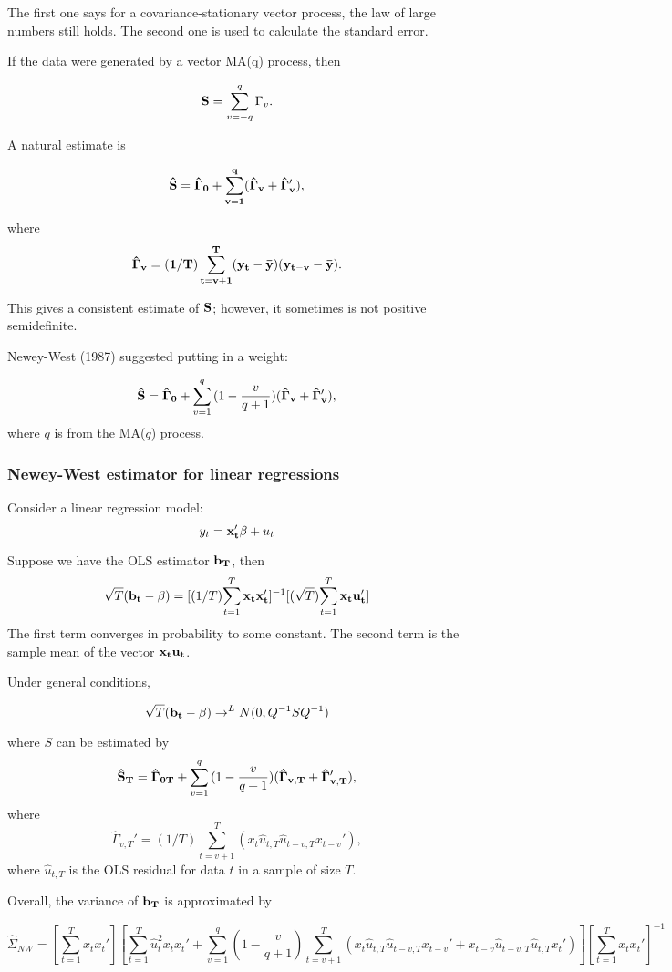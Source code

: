 The first one says for a covariance-stationary vector process, the law
of large numbers still holds.  The second one is used to calculate the
standard error.

If the data were generated by a vector MA(q) process, then 

 \[ {\bf S} = \sum_{v=-q}^{q} \Gamma_v . \]

A natural estimate is

 \[  \bf \hat S = \hat \Gamma_0 + \sum_{v=1}^{q} (\hat \Gamma_v + \hat \Gamma_v' ), \]

where  \[  \bf \hat \Gamma_v = (1/T)  \sum_{t=v+1}^{T} (y_t- \bar y)(y_{t-v} - \bar y). \]

This gives a consistent estimate of $\bf S$; however, it sometimes is
not positive semidefinite.

Newey-West (1987) suggested putting in a weight:

 \[  {\bf \hat S = \hat \Gamma_0} + \sum_{v=1}^{q} {(1- \frac{v}{q+1})} (\bf \hat \Gamma_v + \hat \Gamma_v' ), \]
where $q$ is from the MA($q$) process.


\subsubsection{ Newey-West estimator for linear regressions}

Consider a linear regression model:
\[ y_t={ \bf x_t' \beta} + u_t \]

Suppose we have the OLS estimator $\bf b_T$, then
\[ \sqrt{T} ({\bf b_t - \beta}) = [(1/T) {\sum_{t=1}^T \bf x_t
  x_t'}]^{-1} [({\sqrt{T}}) {\sum_{t=1}^{T} \bf x_t u_t'}] \] The
first term converges in probability to some constant.  The second term
is the sample mean of the vector $\bf x_t u_t$.

Under general conditions, 

\[ \sqrt{T} ({\bf b_t - \beta}) \rightarrow^L N(0, Q^{-1}SQ^{-1}) \] 

where $S$ can be estimated by
 \[  {\bf \hat S_T = \hat \Gamma_{0T}} + \sum_{v=1}^{q} {(1- \frac{v}{q+1})} (\bf \hat \Gamma_{v,T} + \hat \Gamma_{v,T}' ), \]
where 
\[ \hat \Gamma_{v,T}'= (1/T) \sum_{t=v+1}^T (x_t \hat u_{t, T} \hat u_{t-v, T} x_{t-v}'), \]
where $\hat u_{t,T}$ is the OLS residual for data $t$ in a sample of size $T$.

Overall, the variance of $\bf b_T$ is approximated by

\[\hat \Sigma_{NW} = [\sum_{t=1}^T x_t x_t'] [ \sum_{t=1}^T \hat u_t^2 x_t x_t' +  \sum_{v=1}^{q} {(1- \frac{v}{q+1})} \sum_{t=v+1}^T (x_t \hat u_{t, T} \hat u_{t-v, T} x_{t-v}' + x_{t-v} \hat u_{t-v, T} \hat u_{t, T} x_{t}') ] [\sum_{t=1}^T x_t x_t']^{-1} \]


